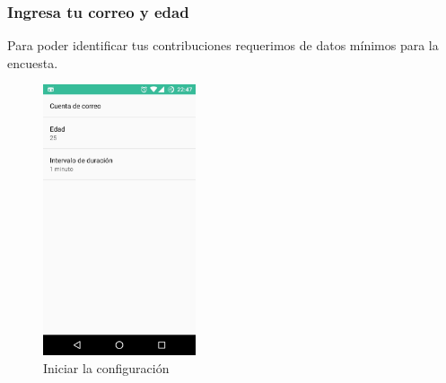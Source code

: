 {\subsubsection{Ingresa tu correo y edad}
\label{config:ingresa-tu-correo-y-edad}
Para poder identificar tus contribuciones requerimos de datos mínimos para la encuesta.
\begin{figure}[h]
\centering
    \includegraphics[width=0.4\textwidth]{anexos/graphics/app_conf.jpg}
\caption{Iniciar la configuración}\label{config:id2}\end{figure}

}
